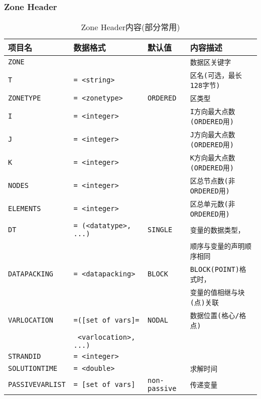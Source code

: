 \documentclass[lang=cn,11pt,a4paper]{elegantpaper}
\begin{document}
\subsubsection{Zone Header}\label{zoneHeader}
\begin{table}[!htb]
  \centering
  \caption{Zone Header内容(部分常用)}
  \begin{tabular}{*{4}{l}}
   \hline
   \textbf{项目名} & \textbf{数据格式} & \textbf{默认值} & \textbf{内容描述} \\
   \hline
   \texttt{ZONE} & \texttt{} & \texttt{} & \texttt{数据区关键字} \\
   \texttt{T} & \texttt{= <string>} & \texttt{} & \texttt{区名(可选，最长128字节)} \\
   \texttt{ZONETYPE} & \texttt{= <zonetype>} & \texttt{ORDERED} & \texttt{区类型} \\
   \texttt{I} & \texttt{= <integer>} & \texttt{} & \texttt{I方向最大点数(ORDERED用)} \\
   \texttt{J} & \texttt{= <integer>} & \texttt{} & \texttt{J方向最大点数(ORDERED用)} \\
   \texttt{K} & \texttt{= <integer>} & \texttt{} & \texttt{K方向最大点数(ORDERED用)} \\
   \texttt{NODES} & \texttt{= <integer>} & \texttt{} & \texttt{区总节点数(非ORDERED用)} \\
   \texttt{ELEMENTS} & \texttt{= <integer>} & \texttt{} & \texttt{区总单元数(非ORDERED用)} \\
   \texttt{DT} & \texttt{= (<datatype>, ...)} & \texttt{SINGLE} & \texttt{变量的数据类型，} \\
   \texttt{~} & \texttt{~} & \texttt{~} & \texttt{顺序与变量的声明顺序相同} \\
   \texttt{DATAPACKING} & \texttt{= <datapacking>} & \texttt{BLOCK} & \texttt{BLOCK(POINT)格式时，} \\
   \texttt{~} & \texttt{~} & \texttt{~} & \texttt{变量的值相继与块(点)关联} \\
   \texttt{VARLOCATION} & \texttt{=([set of vars]=} & \texttt{NODAL} & \texttt{数据位置(格心/格点)} \\
   \texttt{~} & \texttt{  <varlocation>, ...)} & \texttt{~} & \texttt{~} \\
   \texttt{STRANDID} & \texttt{= <integer>} & \texttt{} & \texttt{} \\
   \texttt{SOLUTIONTIME} & \texttt{= <double>} & \texttt{} & \texttt{求解时间} \\
   \texttt{PASSIVEVARLIST} & \texttt{= [set of vars]} & \texttt{non-passive} & \texttt{传递变量} \\
   \hline
  \end{tabular}
\end{table}
\end{document}

